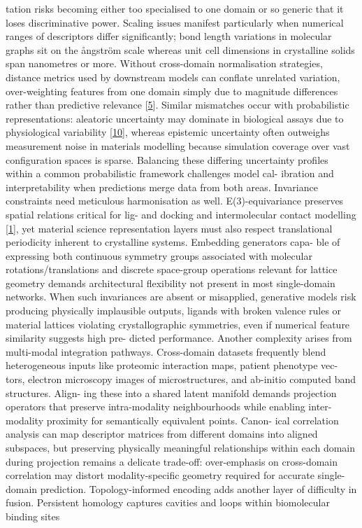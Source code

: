 \documentclass[
]{article}
\begin{document}
tation risks becoming either too specialised to one domain or so generic
that it loses discriminative power. Scaling issues manifest particularly
when numerical ranges of descriptors differ significantly; bond length
variations in molecular graphs sit on the ångström scale whereas unit
cell dimensions in crystalline solids span nanometres or more. Without
cross-domain normalisation strategies, distance metrics used by
downstream models can conflate unrelated variation, over-weighting
features from one domain simply due to magnitude differences rather than
predictive relevance {[}\hyperref[_bookmark45]{5}{]}. Similar mismatches
occur with probabilistic representations: aleatoric uncertainty may
dominate in biological assays due to physiological variability
{[}\hyperref[_bookmark50]{10}{]}, whereas epistemic uncertainty often
outweighs measurement noise in materials modelling because simulation
coverage over vast configuration spaces is sparse. Balancing these
differing uncertainty profiles within a common probabilistic framework
challenges model cal- ibration and interpretability when predictions
merge data from both areas. Invariance constraints need meticulous
harmonisation as well. E(3)-equivariance preserves spatial relations
critical for lig- and docking and intermolecular contact modelling
{[}\hyperref[_bookmark41]{1}{]}, yet material science representation
layers must also respect translational periodicity inherent to
crystalline systems. Embedding generators capa- ble of expressing both
continuous symmetry groups associated with molecular
rotations/translations and discrete space-group operations relevant for
lattice geometry demands architectural flexibility not present in most
single-domain networks. When such invariances are absent or misapplied,
generative models risk producing physically implausible outputs, ligands
with broken valence rules or material lattices violating
crystallographic symmetries, even if numerical feature similarity
suggests high pre- dicted performance. Another complexity arises from
multi-modal integration pathways. Cross-domain datasets frequently blend
heterogeneous inputs like proteomic interaction maps, patient phenotype
vec- tors, electron microscopy images of microstructures, and ab-initio
computed band structures. Align- ing these into a shared latent manifold
demands projection operators that preserve intra-modality neighbourhoods
while enabling inter-modality proximity for semantically equivalent
points. Canon- ical correlation analysis can map descriptor matrices
from different domains into aligned subspaces, but preserving physically
meaningful relationships within each domain during projection remains a
delicate trade-off: over-emphasis on cross-domain correlation may
distort modality-specific geometry required for accurate single-domain
prediction. Topology-informed encoding adds another layer of difficulty
in fusion. Persistent homology captures cavities and loops within
biomolecular binding sites
\end{document}
